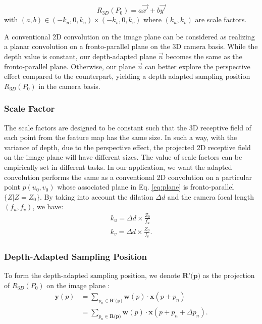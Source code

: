 \documentclass[lettersize,journal]{IEEEtran}
\begin{document}
\begin{equation}
\label{eq:3dgrid}
R_{3D}(P_0) = a \Vec{x'} + b \Vec{y'}
\end{equation}
with $(a,b) \in (- k_u, 0 , k_u) \times (-k_v, 0 , k_v) $ where $(k_u, k_v)$ are scale factors. 


A conventional 2D convolution on the image plane can be considered as realizing a planar convolution on a fronto-parallel plane on the 3D camera basis. While the depth value is constant, our depth-adapted plane $\overrightarrow{n}$ becomes the same as the fronto-parallel plane. Otherwise, our plane $\overrightarrow{n}$ can better explore the perspective effect compared to the counterpart, yielding a depth adapted sampling position $R_{3D}(P_0)$ in the camera basis.


\subsubsection{Scale Factor}

The scale factors are designed to be constant such that the 3D receptive field of each point from the feature map has the same size. In such a way, with the variance of depth, due to the perspective effect, the projected 2D receptive field on the image plane will have different sizes. The value of scale factors can be empirically set in different tasks. In our application, we want the adapted convolution performs the same as a conventional 2D convolution on a particular point $p(u_0,v_0)$ whose associated plane in Eq. \ref{eq:plane} is fronto-parallel $\{Z| Z = Z_{0}\}$. By taking into account the dilation $\Delta d$ and the camera focal length $(f_u, f_v)$, we have: 
\begin{equation}
\begin{split}
k_u = \Delta d \times \frac{Z_{0}}{f_u }  \\
k_v = \Delta d \times \frac{Z_{0}}{f_v }. 
\label{scale}
\end{split}
\end{equation}

\subsubsection{Depth-Adapted Sampling Position}

To form the depth-adapted sampling position, we denote $\textbf{R'(p)}$ as the projection of $R_{3D}(P_0)$ on the image plane : 
\begin{equation}
\begin{split}
   \textbf{y}(p) &= \sum_{p_n\in\textbf{R'(p)}} \textbf{w}(p)  \cdot \textbf{x}(p + p_n) \\
   & =  \sum_{p_n\in\textbf{R(p)}} \textbf{w}(p)  \cdot \textbf{x}(p + p_n + \Delta p_n).
\end{split}
\label{eq:zacn}
\end{equation}
\end{document}
